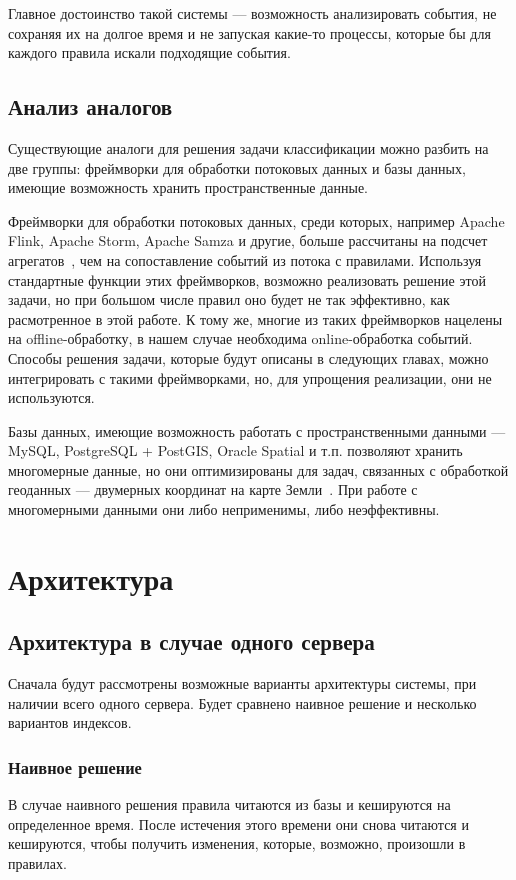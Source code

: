 \documentclass[14pt]{article}
\begin{document}
Главное достоинство такой системы --- возможность анализировать события, не сохраняя их на долгое время и не запуская какие-то процессы, которые бы для каждого правила искали подходящие события.

\subsection{Анализ аналогов}
Существующие аналоги для решения задачи классификации можно разбить на две группы: фреймворки для обработки потоковых данных и базы данных, имеющие возможность хранить пространственные данные.

Фреймворки для обработки потоковых данных, среди которых, например Apache Flink, Apache Storm, Apache Samza и другие, больше рассчитаны на подсчет агрегатов~\cite{flink-use-cases, storm-documentation, samza-streams-api}, чем на сопоставление событий из потока с правилами. Используя стандартные функции этих фреймворков, возможно реализовать решение этой задачи, но при большом числе правил оно будет не так эффективно, как расмотренное в этой работе. К тому же, многие из таких фреймворков нацелены на offline-обработку, в нашем случае необходима online-обработка событий. Способы решения задачи, которые будут описаны в следующих главах, можно интегрировать с такими фреймворками, но, для упрощения реализации, они не используются.

Базы данных, имеющие возможность работать с пространственными данными --- MySQL, PostgreSQL + PostGIS, Oracle Spatial и т.п. позволяют хранить многомерные данные, но они оптимизированы для задач, связанных с обработкой геоданных --- двумерных координат на карте Земли~\cite{mysql-spatial, postgis, oracle-spatial}. При работе с многомерными данными они либо неприменимы, либо неэффективны.

\section{Архитектура}
\subsection{Архитектура в случае одного сервера}
Сначала будут рассмотрены возможные варианты архитектуры системы, при наличии всего одного сервера. Будет сравнено наивное решение и несколько вариантов индексов.

\subsubsection{Наивное решение}
В случае наивного решения правила читаются из базы и кешируются на определенное время. После истечения этого времени они снова читаются и кешируются, чтобы получить изменения, которые, возможно, произошли в правилах.
\end{document}
